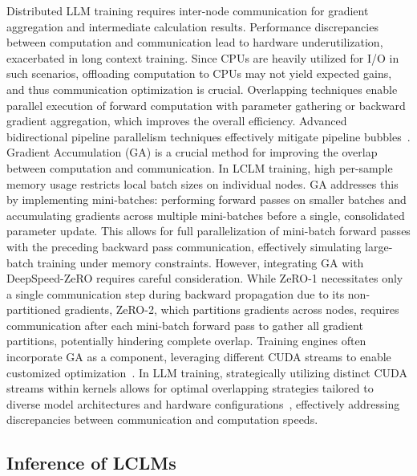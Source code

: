 \documentclass[11pt, a4paper, logo, copyright, nonumbering]{map}
\begin{document}
Distributed LLM training requires inter-node communication for gradient aggregation and intermediate calculation results.
Performance discrepancies between computation and communication lead to hardware underutilization, exacerbated in long context training.
Since CPUs are heavily utilized for I/O in such scenarios, offloading computation to CPUs may not yield expected gains, and thus communication optimization is crucial.
Overlapping techniques enable parallel execution of forward computation with parameter gathering or backward gradient aggregation, which improves the overall efficiency.
Advanced bidirectional pipeline parallelism techniques effectively mitigate pipeline bubbles~\cite{deepseekai2024deepseekv3technicalreport}.
Gradient Accumulation (GA) is a crucial method for improving the overlap between computation and communication.
In LCLM training, high per-sample memory usage restricts local batch sizes on individual nodes.
GA addresses this by implementing mini-batches: performing forward passes on smaller batches and accumulating gradients across multiple mini-batches before a single, consolidated parameter update.
This allows for full parallelization of mini-batch forward passes with the preceding backward pass communication, effectively simulating large-batch training under memory constraints.
However, integrating GA with DeepSpeed-ZeRO requires careful consideration.
While ZeRO-1 necessitates only a single communication step during backward propagation due to its non-partitioned gradients, ZeRO-2, which partitions gradients across nodes, requires communication after each mini-batch forward pass to gather all gradient partitions, potentially hindering complete overlap.
Training engines often incorporate GA as a component, leveraging different CUDA streams to enable customized optimization~\cite{sourouri2014effective}.
In LLM training, strategically utilizing distinct CUDA streams within kernels allows for optimal overlapping strategies tailored to diverse model architectures and hardware configurations~\cite{chang2024flux,kim2024tccl}, effectively addressing discrepancies between communication and computation speeds.



\subsection{Inference of LCLMs}
\end{document}
